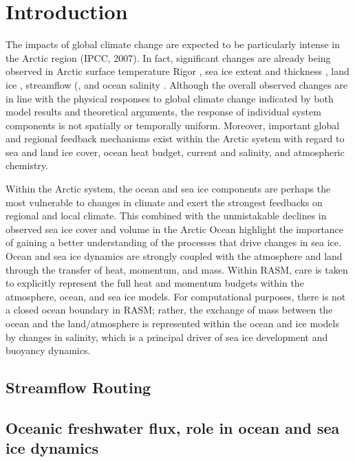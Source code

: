 \section{Introduction}
 
The impacts of global climate change are expected to be particularly intense in the Arctic region (IPCC, 2007).
In fact, significant changes are already being observed in Arctic surface temperature Rigor \citep[e.g.]{Rigor_2000}, sea ice extent and thickness \citep[e.g.]{Kwok_2009,Maslowski_2012}, land ice \citep[e.g.]{Gardner_2011}, streamflow (\citep[e.g.]{Peterson_2002,McClelland_2006,Dai_2009}, and ocean salinity \citep[e.g.]{Steele_2004,Morison_2012}.
Although the overall observed changes are in line with the physical responses to global climate change indicated by both model results and theoretical arguments, the response of individual system components is not spatially or temporally uniform.
Moreover, important global and regional feedback mechanisms exist within the Arctic system with regard to sea and land ice cover, ocean heat budget, current and salinity, and atmospheric chemistry.

Within the Arctic system, the ocean and sea ice components are perhaps the most vulnerable to changes in climate and exert the strongest feedbacks on regional and local climate.
This combined with the unmistakable declines in observed sea ice cover and volume in the Arctic Ocean highlight the importance of gaining a better understanding of the processes that drive changes in sea ice.
Ocean and sea ice dynamics are strongly coupled with the atmosphere and land through the transfer of heat, momentum, and mass. Within RASM, care is taken to explicitly represent the full heat and momentum budgets within the atmosphere, ocean, and sea ice models.
For computational purposes, there is not a closed ocean boundary in RASM; rather, the exchange of mass between the ocean and the land/atmosphere is represented within the ocean and ice models by changes in salinity, which is a principal driver of sea ice development and buoyancy dynamics. 
  
\subsection{Streamflow Routing}

\subsection{Oceanic freshwater flux, role in ocean and sea ice dynamics}

